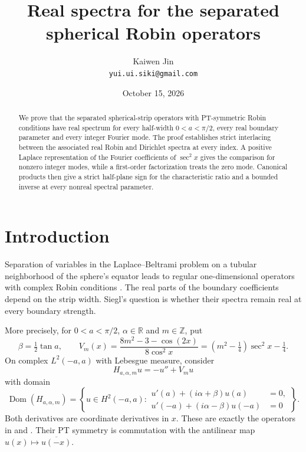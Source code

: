 \documentclass[11pt]{article}
\title{Real spectra for the separated spherical Robin operators}
\author{Kaiwen Jin\\\small\texttt{yui.ui.siki@gmail.com}}
\date{October 15, 2026}
\newcommand{\R}{\mathbb R}
\DeclareMathOperator{\Dom}{Dom}
\begin{document}
\maketitle
\begin{abstract}
We prove that the separated spherical-strip operators with PT-symmetric
Robin conditions have real spectrum for every half-width $0<a<\pi/2$,
every real boundary parameter and every integer Fourier mode.
The proof establishes strict interlacing between the associated real
Robin and Dirichlet spectra at every index. A positive Laplace
representation of the Fourier coefficients of $\sec^2x$ gives the
comparison for nonzero integer modes, while a first-order factorization
treats the zero mode. Canonical products then give a strict half-plane
sign for the characteristic ratio and a bounded inverse at every
nonreal spectral parameter.
\end{abstract}

\section{Introduction}

Separation of variables in the Laplace--Beltrami problem on a tubular
neighborhood of the sphere's equator leads to regular one-dimensional
operators with complex Robin conditions \cite{S,KS}. The real parts of
the boundary coefficients depend on the strip width. Siegl's question
is whether their spectra remain real at every boundary strength.

More precisely, for $0<a<\pi/2$, $\alpha\in\R$ and $m\in\mathbb Z$,
put
\[
 \beta=\tfrac12\tan a,\qquad
 V_m(x)=\frac{8m^2-3-\cos(2x)}{8\cos^2x}
       =(m^2-\tfrac14)\sec^2x-\tfrac14.
\]
On complex $L^2(-a,a)$ with Lebesgue measure, consider
\begin{equation}\label{eq:operator}
 H_{a,\alpha,m}u=-u''+V_mu
\end{equation}
with domain
\begin{equation}\label{eq:domain}
 \Dom(H_{a,\alpha,m})=
 \left\{u\in H^2(-a,a):
 \begin{aligned}
 u'(a)+(i\alpha+\beta)u(a)&=0,\\
 u'(-a)+(i\alpha-\beta)u(-a)&=0
 \end{aligned}\right\}.
\end{equation}
Both derivatives are coordinate derivatives in $x$.
These are exactly the operators in \cite[equation (2)]{S} and
\cite[\S4.4.2, equations (4.32)--(4.33)]{KS}.
Their PT symmetry is commutation with the antilinear map
$u(x)\mapsto\overline{u(-x)}$.
\end{document}
